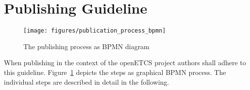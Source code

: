 \documentclass{template/openetcs_article}
\begin{document}

\section{Publishing Guideline}
\label{sct:publishingguideline}

\begin{figure}[H]
\texttt{[image: figures/publication\_process\_bpmn]}
\caption{The publishing process as BPMN diagram}
\label{fig:process}
\end{figure}

When publishing in the context of the openETCS project authors shall adhere to this guideline. Figure~\ref{fig:process} depicts the steps as graphical BPMN process. The individual steps are described in detail in the following.
\end{document}
